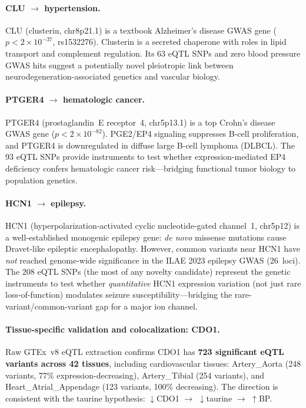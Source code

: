 \documentclass[11pt,openany]{report}
\begin{document}
\paragraph{CLU $\to$ hypertension.}
CLU (clusterin, chr8p21.1) is a textbook Alzheimer's disease GWAS
gene ($p < 2 \times 10^{-37}$, rs1532276).  Clusterin is a secreted
chaperone with roles in lipid transport and complement regulation.
Its 63 eQTL SNPs and zero blood pressure GWAS hits suggest a
potentially novel pleiotropic link between neurodegeneration-associated
genetics and vascular biology.

\paragraph{PTGER4 $\to$ hematologic cancer.}
PTGER4 (prostaglandin~E receptor~4, chr5p13.1) is a top Crohn's
disease GWAS gene ($p < 2 \times 10^{-82}$).  PGE2/EP4 signaling
suppresses B-cell proliferation, and PTGER4 is downregulated in
diffuse large B-cell lymphoma (DLBCL).  The 93 eQTL SNPs provide
instruments to test whether expression-mediated EP4 deficiency
confers hematologic cancer risk---bridging functional tumor biology
to population genetics.

\paragraph{HCN1 $\to$ epilepsy.}
HCN1 (hyperpolarization-activated cyclic nucleotide-gated channel~1,
chr5p12) is a well-established monogenic epilepsy gene:
\emph{de novo} missense mutations cause Dravet-like epileptic
encephalopathy.  However, common variants near HCN1 have
\emph{not} reached genome-wide significance in the ILAE 2023
epilepsy GWAS (26~loci).  The 208 eQTL SNPs (the most of any
novelty candidate) represent the genetic instruments to test
whether \emph{quantitative} HCN1 expression variation (not just
rare loss-of-function) modulates seizure susceptibility---bridging
the rare-variant/common-variant gap for a major ion channel.

\paragraph{Tissue-specific validation and colocalization: CDO1.}
Raw GTEx~v8 eQTL extraction confirms CDO1 has \textbf{723 significant
eQTL variants across 42 tissues}, including cardiovascular tissues:
Artery\_Aorta (248 variants, 77\% expression-decreasing),
Artery\_Tibial (254 variants), and Heart\_Atrial\_Appendage
(123 variants, 100\% decreasing).  The direction is consistent with
the taurine hypothesis:
$\downarrow$CDO1 $\to$ $\downarrow$taurine $\to$ $\uparrow$BP.
\end{document}
